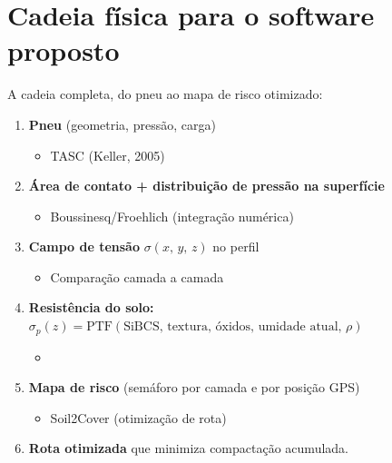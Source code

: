 \documentclass[12pt,a4paper]{article}
\newcommand{\Section}[1]{\needspace{12\baselineskip}\section{#1}}
\begin{document}
\Section{Cadeia física para o software proposto}

A cadeia completa, do pneu ao mapa de risco otimizado:

\begin{enumerate}
  \item \textbf{Pneu} (geometria, pressão, carga)
    \begin{itemize}
      \item[$\downarrow$] TASC (Keller, 2005)
    \end{itemize}
  \item \textbf{Área de contato + distribuição de pressão na superfície}
    \begin{itemize}
      \item[$\downarrow$] Boussinesq/Froehlich (integração numérica)
    \end{itemize}
  \item \textbf{Campo de tensão} $\sigma(x,\,y,\,z)$ no perfil
    \begin{itemize}
      \item[$\downarrow$] Comparação camada a camada
    \end{itemize}
  \item \textbf{Resistência do solo:} $\sigma_p(z) = \text{PTF}(\text{SiBCS, textura, óxidos, umidade atual, }\rho)$
    \begin{itemize}
      \item[$\downarrow$]
    \end{itemize}
  \item \textbf{Mapa de risco} (semáforo por camada e por posição GPS)
    \begin{itemize}
      \item[$\downarrow$] Soil2Cover (otimização de rota)
    \end{itemize}
  \item \textbf{Rota otimizada} que minimiza compactação acumulada.
\end{enumerate}
\end{document}
